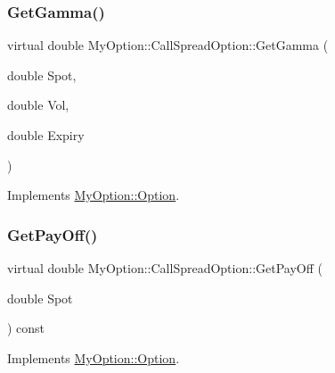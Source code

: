 \hypertarget{classMyOption_1_1CallSpreadOption_ac8dd9fdb03603013350d611e6931a314}{}\label{classMyOption_1_1CallSpreadOption_ac8dd9fdb03603013350d611e6931a314} 
\subsubsection{\texorpdfstring{Get\+Gamma()}{GetGamma()}}
{\footnotesize\ttfamily virtual double My\+Option\+::\+Call\+Spread\+Option\+::\+Get\+Gamma (\begin{DoxyParamCaption}\item[{double}]{Spot,  }\item[{double}]{Vol,  }\item[{double}]{Expiry }\end{DoxyParamCaption})\hspace{0.3cm}{\ttfamily [virtual]}}



Implements \hyperlink{classMyOption_1_1Option_a4416faa432b5004e449394056c7f1363}{My\+Option\+::\+Option}.

\hypertarget{classMyOption_1_1CallSpreadOption_a2e45ec109e4fd26acc6506caa1952c0c}{}\label{classMyOption_1_1CallSpreadOption_a2e45ec109e4fd26acc6506caa1952c0c} 
\subsubsection{\texorpdfstring{Get\+Pay\+Off()}{GetPayOff()}}
{\footnotesize\ttfamily virtual double My\+Option\+::\+Call\+Spread\+Option\+::\+Get\+Pay\+Off (\begin{DoxyParamCaption}\item[{double}]{Spot }\end{DoxyParamCaption}) const\hspace{0.3cm}{\ttfamily [virtual]}}



Implements \hyperlink{classMyOption_1_1Option_a4b6b84dc485153ffadfb32afa9bb52f3}{My\+Option\+::\+Option}.

\hypertarget{classMyOption_1_1CallSpreadOption_a8f9317c21aad28bc1cd78a403b5e4cd3}{}\label{classMyOption_1_1CallSpreadOption_a8f9317c21aad28bc1cd78a403b5e4cd3} 
